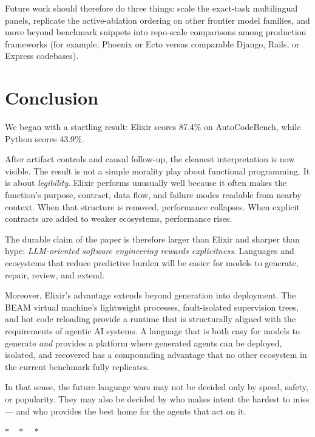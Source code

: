 \documentclass[11pt]{article}
\newcommand{\acb}{AutoCodeBench}
\newcommand{\elixir}{Elixir}
\newcommand{\pythonlang}{Python}
\begin{document}
Future work should therefore do three things: scale the exact-task multilingual panels, replicate the active-ablation ordering on other frontier model families, and move beyond benchmark snippets into repo-scale comparisons among production frameworks (for example, Phoenix or Ecto versus comparable Django, Rails, or Express codebases).

\section{Conclusion}

We began with a startling result: \elixir{} scores 87.4\% on \acb{}, while \pythonlang{} scores 43.9\%.

After artifact controls and causal follow-up, the cleanest interpretation is now visible. The result is not a simple morality play about functional programming. It is about \emph{legibility}. \elixir{} performs unusually well because it often makes the function's purpose, contract, data flow, and failure modes readable from nearby context. When that structure is removed, performance collapses. When explicit contracts are added to weaker ecosystems, performance rises.

The durable claim of the paper is therefore larger than \elixir{} and sharper than hype: \emph{LLM-oriented software engineering rewards explicitness}. Languages and ecosystems that reduce predictive burden will be easier for models to generate, repair, review, and extend.

Moreover, \elixir{}'s advantage extends beyond generation into deployment. The BEAM virtual machine's lightweight processes, fault-isolated supervision trees, and hot code reloading provide a runtime that is structurally aligned with the requirements of agentic AI systems. A language that is both easy for models to generate \emph{and} provides a platform where generated agents can be deployed, isolated, and recovered has a compounding advantage that no other ecosystem in the current benchmark fully replicates.

In that sense, the future language wars may not be decided only by speed, safety, or popularity. They may also be decided by who makes intent the hardest to miss --- and who provides the best home for the agents that act on it.

\bigskip
\begin{center}
$\ast\quad\ast\quad\ast$
\end{center}

\clearpage
\appendix
\end{document}
